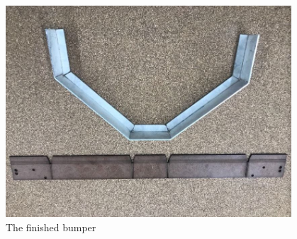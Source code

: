 \begin{figure}[htp]
\centering
  \includegraphics[width=0.95\textwidth]{Meetings/November/11-01-21/11-1-21_Hardware_Figure5 - Nathan Forrer.JPG}
  \caption{The finished bumper}
  \label{fig:110121_8}
\end{figure}


